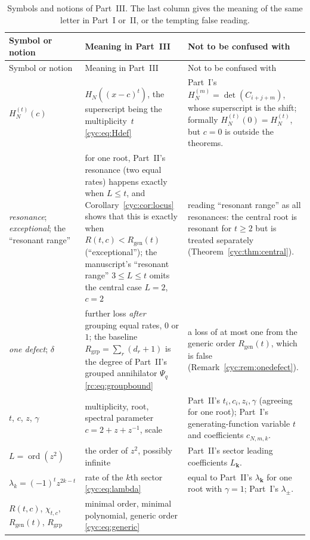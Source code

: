 \documentclass[11pt,a4paper]{article}
\numberwithin{equation}{section}
\theoremstyle{definition}
\theoremstyle{remark}
\newcommand{\bk}{\boldsymbol{k}}
\newcommand{\ord}{\operatorname{ord}}
\newcommand{\cH}[2]{H_{#1}^{(#2)}}
\newcommand{\Rgen}{R_{\mathrm{gen}}}
\newcommand{\Rgrp}{R_{\mathrm{grp}}}
\begin{document}
\begingroup\small
\renewcommand{\arraystretch}{1.15}
\begin{longtable}{@{}>{\raggedright}p{}>{\raggedright}p{}>{\raggedright\arraybackslash}p{}@{}}
\caption{Symbols and notions of Part~III.  The last column gives the
meaning of the same letter in Part~I or~II, or the tempting false
reading.}\label{cyc:tab:notation}\\
\toprule
Symbol or notion & Meaning in Part~III & Not to be confused with\\
\midrule
\endfirsthead
\toprule
Symbol or notion & Meaning in Part~III & Not to be confused with\\
\midrule
\endhead
\bottomrule
\endfoot
$\cH Nt(c)$
 & $H_N((x-c)^t)$, the superscript being the multiplicity~$t$
   \eqref{cyc:eq:Hdef}
 & Part~I's $H_N^{(m)}=\det(C_{i+j+m})$, whose superscript is the shift;
   formally $\cH Nt(0)=H_N^{(t)}$, but $c=0$ is outside the theorems.\\
\emph{resonance}; \emph{exceptional}; the ``resonant range''
 & for one root, Part~II's resonance (two equal rates) happens exactly when
   $L\le t$, and Corollary~\ref{cyc:cor:locus} shows that this is exactly
   when $R(t,c)<\Rgen(t)$ (``exceptional''); the manuscript's
   ``resonant range'' $3\le L\le t$ omits the central case $L=2$, $c=2$
 & reading ``resonant range'' as all resonances: the central root is
   resonant for $t\ge2$ but is treated separately
   (Theorem~\ref{cyc:thm:central}).\\
\emph{one defect}; $\delta$
 & further loss \emph{after} grouping equal rates, $0$ or $1$; the baseline
   $\Rgrp=\sum_r(d_r+1)$ is the degree of Part~II's grouped annihilator
   $\Psi_q$ \eqref{rc:eq:groupbound}
 & a loss of at most one from the generic order $\Rgen(t)$, which is false
   (Remark~\ref{cyc:rem:onedefect}).\\
$t$, $c$, $z$, $\gamma$
 & multiplicity, root, spectral parameter $c=2+z+z^{-1}$, scale
 & Part~II's $t_i,c_i,z_i,\gamma$ (agreeing for one root); Part~I's
   generating-function variable $t$ and coefficients $c_{N,m,k}$.\\
$L=\ord(z^2)$
 & the order of $z^2$, possibly infinite
 & Part~II's sector leading coefficients $L_{\bk}$.\\
$\lambda_k=(-1)^tz^{2k-t}$
 & rate of the $k$th sector \eqref{cyc:eq:lambda}
 & equal to Part~II's $\lambda_{\bk}$ for one root with $\gamma=1$; Part~I's
   $\lambda_\pm$.\\
$R(t,c)$, $\chi_{t,c}$, $\Rgen(t)$, $\Rgrp$
 & minimal order, minimal polynomial, generic order \eqref{cyc:eq:generic}

\end{longtable}
\end{document}
